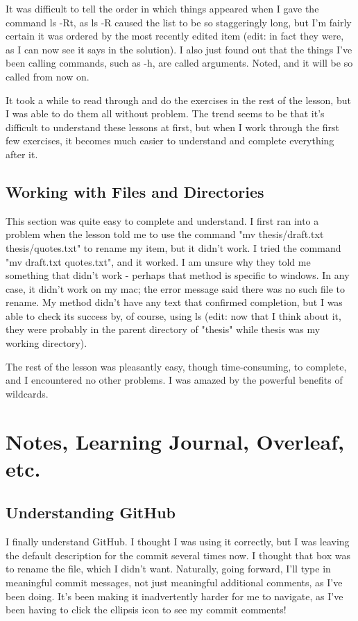 \documentclass{article}
\begin{document}
It was difficult to tell the order in which things appeared when I gave the command ls -Rt, as ls -R caused the list to be so staggeringly long, but I'm fairly certain it was ordered by the most recently edited item (edit: in fact they were, as I can now see it says in the solution). I also just found out that the things I've been calling commands, such as -h, are called arguments. Noted, and it will be so called from now on.

It took a while to read through and do the exercises in the rest of the lesson, but I was able to do them all without problem. The trend seems to be that it's difficult to understand these lessons at first, but when I work through the first few exercises, it becomes much easier to understand and complete everything after it.

\subsection{Working with Files and Directories}
This section was quite easy to complete and understand. I first ran into a problem when the lesson told me to use the command "mv thesis/draft.txt thesis/quotes.txt" to rename my item, but it didn't work. I tried the command "mv draft.txt quotes.txt", and it worked. I am unsure why they told me something that didn't work - perhaps that method is specific to windows. In any case, it didn't work on my mac; the error message said there was no such file to rename. My method didn't have any text that confirmed completion, but I was able to check its success by, of course, using ls (edit: now that I think about it, they were probably in the parent directory of "thesis" while thesis was my working directory).

The rest of the lesson was pleasantly easy, though time-consuming, to complete, and I encountered no other problems. I was amazed by the powerful benefits of wildcards.

\section{Notes, Learning Journal, Overleaf, etc.}
\subsection{Understanding GitHub}
I finally understand GitHub. I thought I was using it correctly, but I was leaving the default description for the commit several times now. I thought that box was to rename the file, which I didn't want. Naturally, going forward, I'll type in meaningful commit messages, not just meaningful additional comments, as I've been doing. It's been making it inadvertently harder for me to navigate, as I've been having to click the ellipsis icon to see my commit comments!
\end{document}
